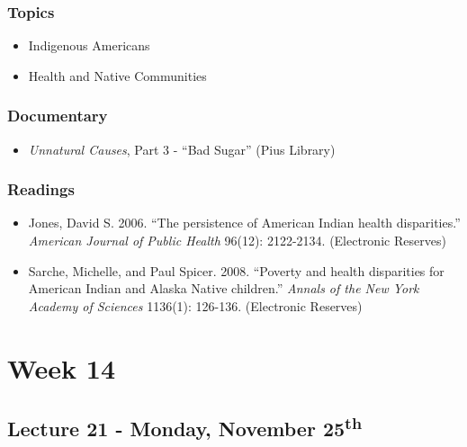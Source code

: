 \documentclass[]{book}
\providecommand{\tightlist}{%
  \setlength{\itemsep}{0pt}\setlength{\parskip}{0pt}}
\begin{document}
\hypertarget{topics-25}{%
\subsubsection*{Topics}\label{topics-25}}

\begin{itemize}
\tightlist
\item
  Indigenous Americans
\item
  Health and Native Communities
\end{itemize}

\hypertarget{documentary-2}{%
\subsubsection*{Documentary}\label{documentary-2}}

\begin{itemize}
\tightlist
\item
  \emph{Unnatural Causes}, Part 3 - ``Bad Sugar'' (Pius Library)
\end{itemize}

\hypertarget{readings-23}{%
\subsubsection*{Readings}\label{readings-23}}

\begin{itemize}
\tightlist
\item
  Jones, David S. 2006. ``The persistence of American Indian health disparities.'' \emph{American Journal of Public Health} 96(12): 2122-2134. (Electronic Reserves)
\item
  Sarche, Michelle, and Paul Spicer. 2008. ``Poverty and health disparities for American Indian and Alaska Native children.'' \emph{Annals of the New York Academy of Sciences} 1136(1): 126-136. (Electronic Reserves)
\end{itemize}

\hypertarget{week-14}{%
\section*{Week 14}\label{week-14}}

\hypertarget{lecture-21---monday-november-25th}{%
\subsection*{\texorpdfstring{Lecture 21 - Monday, November 25\textsuperscript{th}}{Lecture 21 - Monday, November 25th}}\label{lecture-21---monday-november-25th}}
\end{document}

